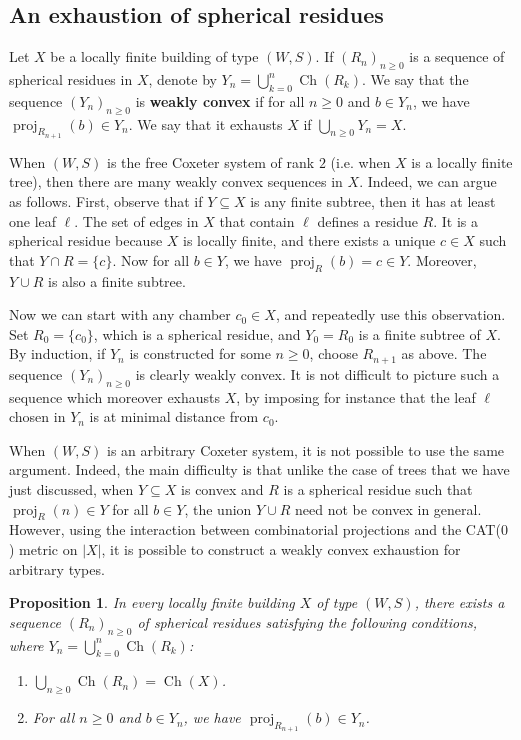 \documentclass[12pt,a4paper]{amsproc}
\newtheorem{proposition}[theorem]{Proposition}
\theoremstyle{definition}
\DeclareMathOperator{\Ch}{Ch}
\DeclareMathOperator{\proj}{proj}
\begin{document}
\subsection{An exhaustion of spherical residues}

Let $X$ be a locally finite building of type $(W,S)$. If $(R_n)_{n\geq 0}$ is a sequence of spherical residues in $X$, denote by $Y_n = \bigcup_{k=0}^n \Ch(R_k)$. We say that the sequence $(Y_n)_{n\geq 0}$ is \textbf{weakly convex} if for all $n\geq 0$ and $b\in Y_n$, we have $\proj_{R_{n+1}}(b) \in Y_n$. We say that it exhausts $X$ if $\bigcup_{n \geq 0} Y_n = X$.

When $(W,S)$ is the free Coxeter system of rank $2$ (i.e. when $X$ is a locally finite tree), then there are many weakly convex sequences in $X$. Indeed, we can argue as follows. First, observe that if $Y\subseteq X$ is any finite subtree, then it has at least one leaf $\ell$. The set of edges in $X$ that contain $\ell$ defines a residue $R$. It is a spherical residue because $X$ is locally finite, and there exists a unique $c\in X$ such that $Y \cap R = \{ c \}$. Now for all $b\in Y$, we have $\proj_R(b) = c \in Y$. Moreover, $Y\cup R$ is also a finite subtree. 

Now we can start with any chamber $c_0 \in X$, and repeatedly use this observation. Set $R_0 = \{ c_0\}$, which is a spherical residue, and $Y_0 = R_0$ is a finite subtree of $X$. By induction, if $Y_n$ is constructed for some $n\geq 0$, choose $R_{n+1}$ as above. The sequence $(Y_n)_{n\geq 0}$ is clearly weakly convex. It is not difficult to picture such a sequence which moreover exhausts $X$, by imposing for instance that the leaf $\ell$ chosen in $Y_n$ is at minimal distance from $c_0$.

When $(W,S)$ is an arbitrary Coxeter system, it is not possible to use the same argument. Indeed, the main difficulty is that unlike the case of trees that we have just discussed, when $Y\subseteq X$ is convex and $R$ is a spherical residue such that $\proj_R(n) \in Y$ for all $b\in Y$, the union $Y\cup R$ need not be convex in general. However, using the interaction between combinatorial projections and the CAT($0$) metric on $|X|$, it is possible to construct a weakly convex exhaustion for arbitrary types.


\begin{proposition}\label{prop:exhaustion}
In every locally finite building  $X$  of type $(W, S)$, there exists a sequence $(R_n)_{n \geq 0}$ of spherical residues satisfying the following conditions, where $  Y_n = \bigcup_{k=0}^n \Ch(R_k)$:
\begin{enumerate}[label=(\arabic*)]
\item $\bigcup_{n \geq 0} \Ch(R_n) = \Ch(X)$.

\item For all $n \geq 0$ and $b \in   Y_n$, we have $\proj_{R_{n+1}}(b) \in Y_n$. 
\end{enumerate}
	
\end{proposition}
\end{document}
